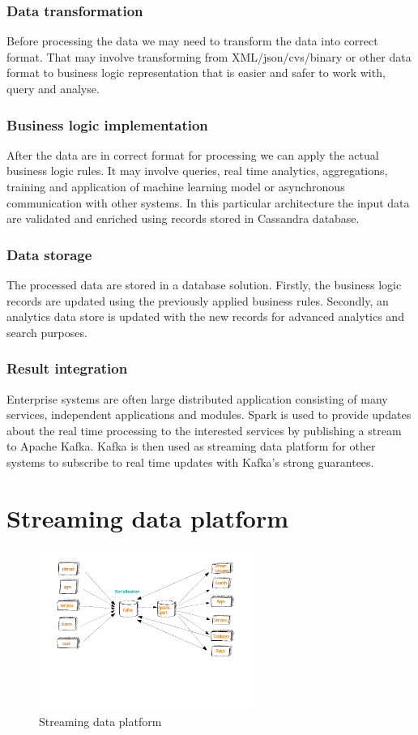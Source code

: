 \documentclass[a4paper, 10 pt, conference]{IEEEtran}
\begin{document}
\subsubsection{Data transformation}
Before processing the data we may need to transform the data into correct format. That may involve transforming from XML/json/cvs/binary or other data format to business logic representation that is easier and safer to work with, query and analyse.

\subsubsection{Business logic implementation}
After the data are in correct format for processing we can apply the actual business logic rules. It may involve queries, real time analytics, aggregations, training and application of machine learning model or asynchronous communication with other systems. In this particular architecture the input data are validated and enriched using records stored in Cassandra database.

\subsubsection{Data storage}
The processed data are stored in a database solution. Firstly, the business logic records are updated using the previously applied business rules. Secondly, an analytics data store is updated with the new records for advanced analytics and search purposes. 

\subsubsection{Result integration}
Enterprise systems are often large distributed application consisting of many services, independent applications and modules. Spark is used to provide updates about the real time processing to the interested services by publishing a stream to Apache Kafka. Kafka is then used as streaming data platform for other systems to subscribe to real time updates with Kafka's strong guarantees.

\section{Streaming data platform}

\begin{figure}[hb]
	\begin{center}
		\caption{Streaming data platform}
		\label{fig:streamingDataPlatform}
		\includegraphics[width=7cm,keepaspectratio]{streaming-data-platform.png}
	\end{center}
\end{figure}
\end{document}
